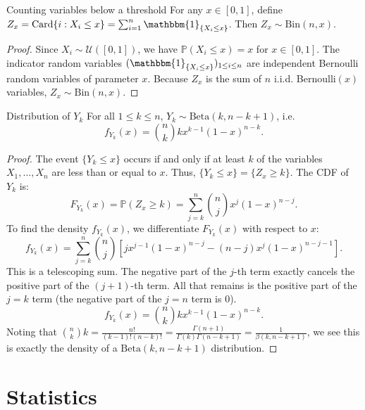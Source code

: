 \documentclass[11pt, a4paper]{article}
\begin{document}
\begin{lemma}{Counting variables below a threshold}{} %
For any $x \in [0, 1]$, define $Z_x = \text{Card}\{i : X_i \le x\} = \sum_{i=1}^n \mathbbm{1}_{\{X_i \le x\}}$. %
Then $Z_x \sim \text{Bin}(n, x)$. %
\end{lemma}

\begin{proof} %
Since $X_i \sim \mathcal{U}([0,1])$, we have $\mathbb{P}(X_i \le x) = x$ for $x \in [0,1]$.
The indicator random variables $(\mathbbm{1}_{\{X_i \le x\}})_{1 \le i \le n}$ are independent Bernoulli random variables of parameter $x$. %
Because $Z_x$ is the sum of $n$ i.i.d. Bernoulli$(x)$ variables, $Z_x \sim \text{Bin}(n, x)$. %
\end{proof}

\begin{proposition}{Distribution of $Y_k$}{} %
For all $1 \le k \le n$, $Y_k \sim \text{Beta}(k, n - k + 1)$, i.e. %
\[ f_{Y_k}(x) = \binom{n}{k} k x^{k-1} (1-x)^{n-k}. \] %
\end{proposition}

\begin{proof}
The event $\{Y_k \le x\}$ occurs if and only if at least $k$ of the variables $X_1, \dots, X_n$ are less than or equal to $x$. 
Thus, $\{Y_k \le x\} = \{Z_x \ge k\}$. The CDF of $Y_k$ is:
\[ F_{Y_k}(x) = \mathbb{P}(Z_x \ge k) = \sum_{j=k}^n \binom{n}{j} x^j (1-x)^{n-j}. \]
To find the density $f_{Y_k}(x)$, we differentiate $F_{Y_k}(x)$ with respect to $x$:
\[ f_{Y_k}(x) = \sum_{j=k}^n \binom{n}{j} \left[ j x^{j-1} (1-x)^{n-j} - (n-j) x^j (1-x)^{n-j-1} \right]. \]
This is a telescoping sum. The negative part of the $j$-th term exactly cancels the positive part of the $(j+1)$-th term. All that remains is the positive part of the $j=k$ term (the negative part of the $j=n$ term is 0).
\[ f_{Y_k}(x) = \binom{n}{k} k x^{k-1} (1-x)^{n-k}. \]
Noting that $\binom{n}{k}k = \frac{n!}{(k-1)!(n-k)!} = \frac{\Gamma(n+1)}{\Gamma(k)\Gamma(n-k+1)} = \frac{1}{\beta(k, n-k+1)}$, we see this is exactly the density of a $\text{Beta}(k, n-k+1)$ distribution.
\end{proof}

\newpage


\part{Statistics}
\end{document}
